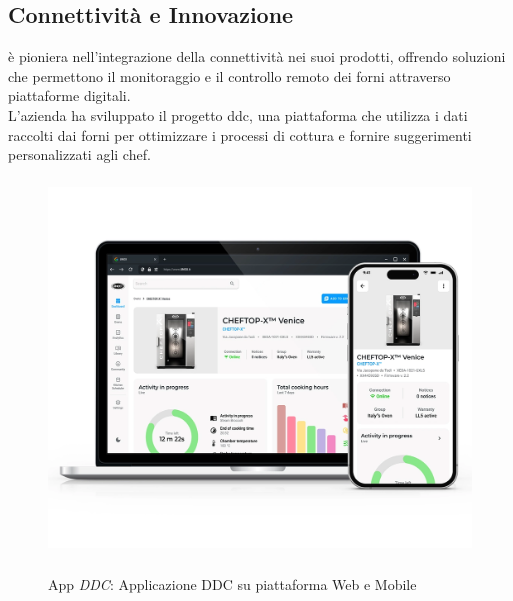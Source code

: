 \subsection{Connettività e Innovazione}
\myAzienda è pioniera nell'integrazione della connettività nei suoi prodotti, offrendo soluzioni che permettono il monitoraggio e il controllo remoto dei forni attraverso piattaforme digitali.
\\L'azienda ha sviluppato il progetto \gls{ddc}\glox, una piattaforma che utilizza i dati raccolti dai forni per ottimizzare i processi di cottura e fornire suggerimenti personalizzati agli chef.

\begin{figure}[H]
    \centering
    \includegraphics[alt={Immagine della applicazione DDC su piattaforma Web e Mobile}, height=10cm]{img/ddc.png}
    \caption{App \textit{DDC}: Applicazione DDC su piattaforma Web e Mobile}
    \label{fig:ddc}
\end{figure}


